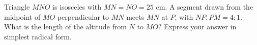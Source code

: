 Triangle $MNO$ is isosceles with $MN=NO=25$ cm. A segment drawn from the midpoint of $MO$ perpendicular to $MN$ meets $MN$ at $P$, with $NP:PM=4:1$. What is the length of the altitude from $N$ to $MO$? Express your answer in simplest radical form.
